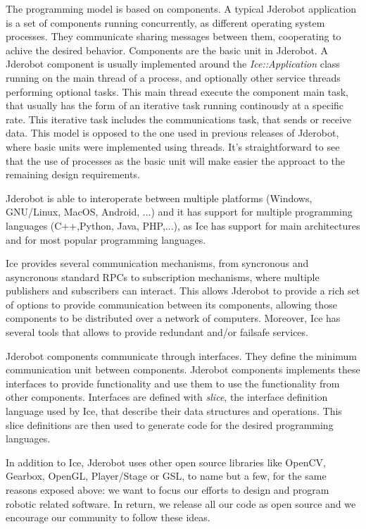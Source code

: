 \documentclass[twocolumn]{svjour3}          %
\begin{document}
The programming model is based on components. A typical Jderobot application is a set of components running concurrently, as different operating system processes. They communicate sharing messages between them, cooperating to achive the desired behavior. Components are the basic unit in Jderobot. A Jderobot component is usually implemented around the \textit{Ice::Application} class running on the main thread of a process, and optionally other service threads performing optional tasks. This main thread execute the component main task, that usually has the form of an iterative task running continously at a specific rate. This iterative task includes the communications task, that sends or receive data. This model is opposed to the one used in previous releases of Jderobot, where basic units were implemented using threads. It's straightforward to see that the use of processes as the basic unit will make easier the approact to the remaining design requirements.

Jderobot is able to interoperate between multiple platforms (Windows, GNU/Linux, MacOS, Android, ...) and it has support for multiple programming languages (C++,Python, Java, PHP,...), as Ice has support for main architectures and for most popular programming languages.

Ice provides several communication mechanisms, from syncronous and asyncronous standard RPCs to subscription mechanisms, where multiple publishers and subscribers can interact. This allows Jderobot to provide a rich set of options to provide communication between its components, allowing those components to be distributed over a network of computers. Moreover, Ice has several tools that allows to provide redundant and/or failsafe services.

Jderobot components communicate through interfaces. They define the minimum communication unit between components. Jderobot components implements these interfaces to provide functionality and use them to use the functionality from other components. Interfaces are defined with \textit{slice}, the interface definition language used by Ice, that describe their data structures and operations. This slice definitions are then used to generate code for the desired programming languages.

In addition to Ice, Jderobot uses other open source libraries like OpenCV, Gearbox, OpenGL, Player/Stage or GSL, to name but a few, for the same reasons exposed above: we want to focus our efforts to design and program robotic related software. In return, we release all our code as open source and we encourage our community to follow these ideas.
\end{document}
